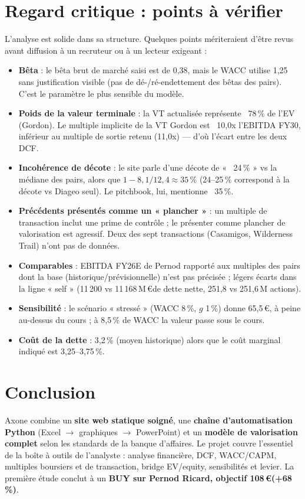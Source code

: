\documentclass[11pt,a4paper]{article}
\newcommand{\eur}{\,€}
\begin{document}
\section{Regard critique : points à vérifier}
L'analyse est solide dans sa structure. Quelques points mériteraient d'être revus avant
diffusion à un recruteur ou à un lecteur exigeant :
\begin{itemize}
  \item \textbf{Bêta} : le bêta brut de marché saisi est de 0,38, mais le WACC utilise 1,25 sans
        justification visible (pas de dé-/ré-endettement des bêtas des pairs). C'est le
        paramètre le plus sensible du modèle.
  \item \textbf{Poids de la valeur terminale} : la VT actualisée représente ~78\,\% de l'EV
        (Gordon). Le multiple implicite de la VT Gordon est ~10,0x l'EBITDA FY30, inférieur au
        multiple de sortie retenu (11,0x) — d'où l'écart entre les deux DCF.
  \item \textbf{Incohérence de décote} : le site parle d'une décote de « ~24\,\% » vs la médiane
        des pairs, alors que $1 - 8{,}1/12{,}4 \approx 35\,\%$ (24--25\,\% correspond à la
        décote vs Diageo seul). Le pitchbook, lui, mentionne ~35\,\%.
  \item \textbf{Précédents présentés comme un « plancher »} : un multiple de transaction inclut une
        prime de contrôle ; le présenter comme plancher de valorisation est agressif. Deux des
        sept transactions (Casamigos, Wilderness Trail) n'ont pas de données.
  \item \textbf{Comparables} : EBITDA FY26E de Pernod rapporté aux multiples des pairs dont la base
        (historique/prévisionnelle) n'est pas précisée ; légers écarts dans la ligne « self »
        (11\,200 vs 11\,168\,M\eur de dette nette, 251,8 vs 251,6\,M actions).
  \item \textbf{Sensibilité} : le scénario « stressé » (WACC 8\,\%, $g$ 1\,\%) donne 65,5\eur, à
        peine au-dessus du cours ; à 8,5\,\% de WACC la valeur passe sous le cours.
  \item \textbf{Coût de la dette} : 3,2\,\% (moyen historique) alors que le coût marginal indiqué
        est 3,25–3,75\,\%.
\end{itemize}

\section{Conclusion}
Axone combine un \textbf{site web statique soigné}, une \textbf{chaîne d'automatisation Python}
(Excel $\rightarrow$ graphiques $\rightarrow$ PowerPoint) et un \textbf{modèle de valorisation
complet} selon les standards de la banque d'affaires. Le projet couvre l'essentiel de la
boîte à outils de l'analyste : analyse financière, DCF, WACC/CAPM, multiples boursiers et de
transaction, bridge EV/equity, sensibilités et levier. La première étude conclut à un
\textbf{BUY sur Pernod Ricard, objectif 108\eur (+68\,\%)}.
\end{document}
